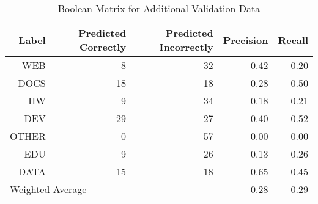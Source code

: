 \begin{table}[h]
\centering
\caption{Boolean Matrix for Additional Validation Data}
\label{boolean_matrix_file_names_add_validation}
\begin{tabular}{|r|r|r|r|r|}
 \hline
Label & Predicted Correctly & Predicted Incorrectly & Precision & Recall \\ \hline
WEB & 8 & 32 & 0.42 & 0.20 \\ \hline
DOCS & 18 & 18 & 0.28 & 0.50 \\ \hline
HW & 9 & 34 & 0.18 & 0.21 \\ \hline
DEV & 29 & 27 & 0.40 & 0.52 \\ \hline
OTHER & 0 & 57 & 0.00 & 0.00 \\ \hline
EDU & 9 & 26 & 0.13 & 0.26 \\ \hline
DATA & 15 & 18 & 0.65 & 0.45 \\ \hline
\multicolumn{3}{|l|}{Weighted Average} & 0.28 & 0.29 \\ \hline
\end{tabular}
\end{table}